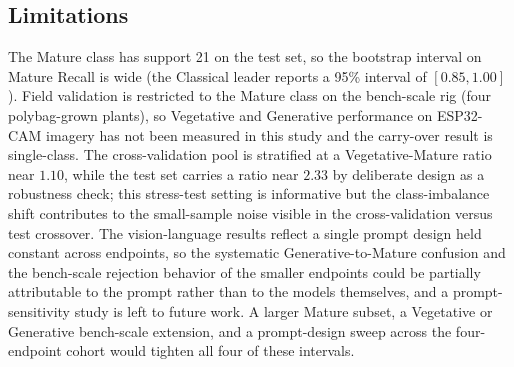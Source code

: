 \subsection{Limitations}

The Mature class has support 21 on the test set, so the bootstrap interval on Mature Recall is wide (the Classical leader reports a 95\% interval of $[0.85, 1.00]$). Field validation is restricted to the Mature class on the bench-scale rig (four polybag-grown plants), so Vegetative and Generative performance on ESP32-CAM imagery has not been measured in this study and the carry-over result is single-class. The cross-validation pool is stratified at a Vegetative-Mature ratio near $1.10$, while the test set carries a ratio near $2.33$ by deliberate design as a robustness check; this stress-test setting is informative but the class-imbalance shift contributes to the small-sample noise visible in the cross-validation versus test crossover. The vision-language results reflect a single prompt design held constant across endpoints, so the systematic Generative-to-Mature confusion and the bench-scale rejection behavior of the smaller endpoints could be partially attributable to the prompt rather than to the models themselves, and a prompt-sensitivity study is left to future work. A larger Mature subset, a Vegetative or Generative bench-scale extension, and a prompt-design sweep across the four-endpoint cohort would tighten all four of these intervals.
